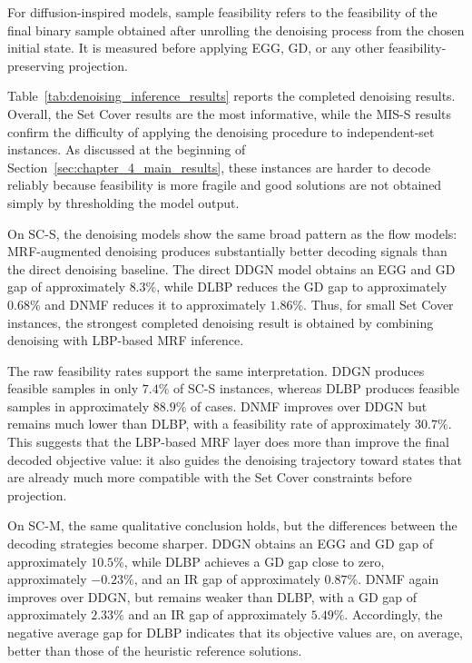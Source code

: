 For diffusion-inspired models, sample feasibility refers to the feasibility of the final binary sample obtained after unrolling the denoising process from the chosen initial state. It is measured before applying EGG, GD, or any other feasibility-preserving projection.



Table~\ref{tab:denoising_inference_results} reports the completed denoising results. Overall, the Set Cover results are the most informative, while the MIS-S results confirm the difficulty of applying the denoising procedure to independent-set instances. As discussed at the beginning of Section~\ref{sec:chapter_4_main_results}, these instances are harder to decode reliably because feasibility is more fragile and good solutions are not obtained simply by thresholding the model output.

On SC-S, the denoising models show the same broad pattern as the flow models: MRF-augmented denoising produces substantially better decoding signals than the direct denoising baseline. The direct DDGN model obtains an EGG and GD gap of approximately $8.3\%$, while DLBP reduces the GD gap to approximately $0.68\%$ and DNMF reduces it to approximately $1.86\%$. Thus, for small Set Cover instances, the strongest completed denoising result is obtained by combining denoising with LBP-based MRF inference.

The raw feasibility rates support the same interpretation. DDGN produces feasible samples in only $7.4\%$ of SC-S instances, whereas DLBP produces feasible samples in approximately $88.9\%$ of cases. DNMF improves over DDGN but remains much lower than DLBP, with a feasibility rate of approximately $30.7\%$. This suggests that the LBP-based MRF layer does more than improve the final decoded objective value: it also guides the denoising trajectory toward states that are already much more compatible with the Set Cover constraints before projection.

On SC-M, the same qualitative conclusion holds, but the differences between the decoding strategies become sharper. DDGN obtains an EGG and GD gap of approximately $10.5\%$, while DLBP achieves a GD gap close to zero, approximately $-0.23\%$, and an IR gap of approximately $0.87\%$. DNMF again improves over DDGN, but remains weaker than DLBP, with a GD gap of approximately $2.33\%$ and an IR gap of approximately $5.49\%$. Accordingly, the negative average gap for DLBP indicates that its objective values are, on average, better than those of the heuristic reference solutions.


